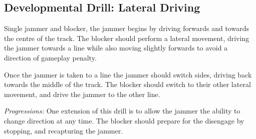 \subsection*{Developmental Drill: Lateral Driving}
\label{drill:one_on_one/developmental/lateral_driving}

Single jammer and blocker, the jammer begins by driving forwards and towards the centre of the track. 
The blocker should perform a lateral movement, driving the jammer towards a line while also moving slightly forwards to avoid a direction of gameplay penalty.

Once the jammer is taken to a line the jammer should switch sides, driving back towards the middle of the track.
The blocker should switch to their other lateral movement, and drive the jammer to the other line. 
 

{\it Progressions:}
One extension of this drill is to allow the jammer the ability to change direction at any time.
The blocker should prepare for the disengage by stopping, and recapturing the jammer.

